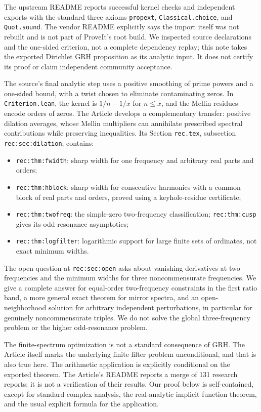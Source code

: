 \documentclass[11pt]{article}
\theoremstyle{remark}\newtheorem{remark}[theorem]{Remark}
\begin{document}
The upstream README reports successful kernel checks and independent exports with the standard three axioms \texttt{propext}, \texttt{Classical.choice}, and \texttt{Quot.sound}. The vendor README explicitly says the import itself was not rebuilt and is not part of ProveIt's root build. We inspected source declarations and the one-sided criterion, not a complete dependency replay; this note takes the exported Dirichlet GRH proposition as its analytic input. It does not certify its proof or claim independent community acceptance.

The source's final analytic step uses a positive smoothing of prime powers and a one-sided bound, with a twist chosen to eliminate contaminating zeros. In \texttt{Criterion.lean}, the kernel is $1/n-1/x$ for $n\le x$, and the Mellin residues encode orders of zeros. The Article develops a complementary transfer: positive dilation averages, whose Mellin multipliers can annihilate prescribed spectral contributions while preserving inequalities. Its Section \texttt{rec.tex}, subsection \texttt{rec:sec:dilation}, contains:
\begin{itemize}[leftmargin=*]
\item \texttt{rec:thm:fwidth}: sharp width for one frequency and arbitrary real parts and orders;
\item \texttt{rec:thm:hblock}: sharp width for consecutive harmonics with a common block of real parts and orders, proved using a keyhole-residue certificate;
\item \texttt{rec:thm:twofreq}: the simple-zero two-frequency classification; \texttt{rec:thm:cusp} gives its odd-resonance asymptotics;
\item \texttt{rec:thm:logfilter}: logarithmic support for large finite sets of ordinates, not exact minimum widths.
\end{itemize}
The open question at \texttt{rec:sec:open} asks about vanishing derivatives at two frequencies and the minimum widths for three noncommensurate frequencies. We give a complete answer for equal-order two-frequency constraints in the first ratio band, a more general exact theorem for mirror spectra, and an open-neighborhood solution for arbitrary independent perturbations, in particular for genuinely noncommensurate triples. We do not solve the global three-frequency problem or the higher odd-resonance problem.

The finite-spectrum optimization is not a standard consequence of GRH. The Article itself marks the underlying finite filter problem unconditional, and that is also true here. The arithmetic application is explicitly conditional on the exported theorem. The Article's README reports a merge of 131 research reports; it is not a verification of their results. Our proof below is self-contained, except for standard complex analysis, the real-analytic implicit function theorem, and the usual explicit formula for the application.
\end{document}
